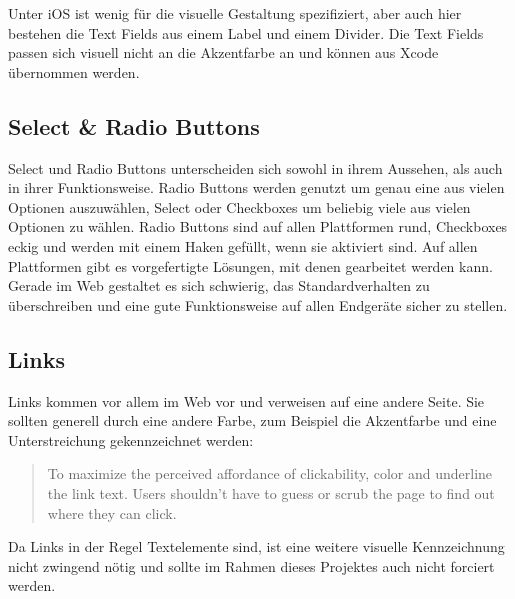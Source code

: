 Unter iOS ist wenig für die visuelle Gestaltung spezifiziert, aber auch hier bestehen die Text Fields aus einem Label und einem Divider. Die Text Fields passen sich visuell nicht an die Akzentfarbe an und können aus Xcode übernommen werden.

\subsection{Select \& Radio Buttons}
Select und Radio Buttons unterscheiden sich sowohl in ihrem Aussehen, als auch in ihrer Funktionsweise. Radio Buttons werden genutzt um genau eine aus vielen Optionen auszuwählen, Select oder Checkboxes um beliebig viele aus vielen Optionen zu wählen. Radio Buttons sind auf allen Plattformen rund, Checkboxes eckig und werden mit einem Haken gefüllt, wenn sie aktiviert sind. Auf allen Plattformen gibt es vorgefertigte Lösungen, mit denen gearbeitet werden kann. Gerade im Web gestaltet es sich schwierig, das Standardverhalten zu überschreiben und eine gute Funktionsweise auf allen Endgeräte sicher zu stellen.

\subsection{Links}
Links kommen vor allem im Web vor und verweisen auf eine andere Seite.
Sie sollten generell durch eine andere Farbe, zum Beispiel die Akzentfarbe und eine Unterstreichung gekennzeichnet werden:

\begin{quote}
To maximize the perceived affordance of clickability, color and underline the link text. Users shouldn't have to guess or scrub the page to find out where they can click.
\end{quote}

Da Links in der Regel Textelemente sind, ist eine weitere visuelle Kennzeichnung nicht zwingend nötig und sollte im Rahmen dieses Projektes auch nicht forciert werden.

